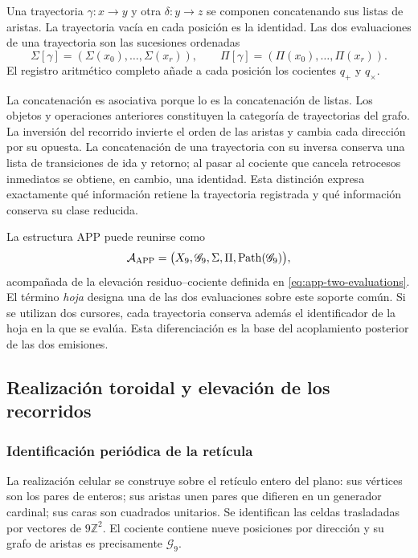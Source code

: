 \begin{definicion}
\label{geo:def-composicion}
Una trayectoria $\gamma:x\to y$ y otra $\delta:y\to z$ se componen concatenando sus listas de aristas. La trayectoria vacía en cada posición es la identidad. Las dos evaluaciones de una trayectoria son las sucesiones ordenadas
\[
 \Sigma[\gamma]=(\Sigma(x_0),\ldots,\Sigma(x_r)),\qquad
 \Pi[\gamma]=(\Pi(x_0),\ldots,\Pi(x_r)).
\]
El registro aritmético completo añade a cada posición los cocientes $q_+$ y $q_\times$.
\end{definicion}

La concatenación es asociativa porque lo es la concatenación de listas. Los objetos y operaciones anteriores constituyen la categoría de trayectorias del grafo. La inversión del recorrido invierte el orden de las aristas y cambia cada dirección por su opuesta. La concatenación de una trayectoria con su inversa conserva una lista de transiciones de ida y retorno; al pasar al cociente que cancela retrocesos inmediatos se obtiene, en cambio, una identidad. Esta distinción expresa exactamente qué información retiene la trayectoria registrada y qué información conserva su clase reducida.

La estructura APP puede reunirse como
\[
 \mathcal A_{\rm APP}=
 \bigl(X_9,\mathscr G_9,\Sigma,\Pi,
             \operatorname{Path}(\mathscr G_9)\bigr),
\]
acompañada de la elevación residuo--cociente definida en \eqref{eq:app-two-evaluations}. El término \emph{hoja} designa una de las dos evaluaciones sobre este soporte común. Si se utilizan dos cursores, cada trayectoria conserva además el identificador de la hoja en la que se evalúa. Esta diferenciación es la base del acoplamiento posterior de las dos emisiones.

\subsection{Realización toroidal y elevación de los recorridos}
\label{geo:toro}

\subsubsection{Identificación periódica de la retícula}

La realización celular se construye sobre el retículo entero del plano: sus vértices son los pares de enteros; sus aristas unen pares que difieren en un generador cardinal; sus caras son cuadrados unitarios. Se identifican las celdas trasladadas por vectores de $9\mathbb Z^2$. El cociente contiene nueve posiciones por dirección y su grafo de aristas es precisamente $\mathscr G_9$.


